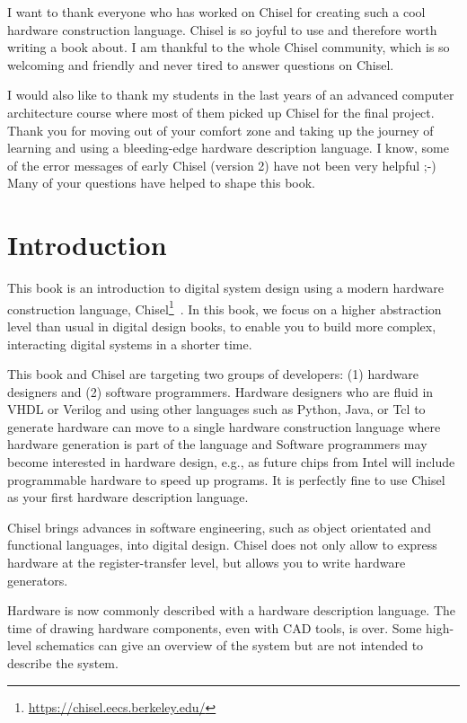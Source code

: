 \documentclass[%
    10pt,
    headinclude, footexclude,
    openright, %
    notitlepage,
    cleardoubleempty,
    headsepline,
    pointlessnumbers,
    bibtotoc, idxtotoc,
    ]{scrbook}
\newcommand{\myref}[2]{\href{#1}{#2}}
\renewcommand{\myref}[2]{{#2}{\footnote{\url{#1}}}}
\begin{document}
I want to thank everyone who has worked on Chisel for creating such
a cool hardware construction language. Chisel is so joyful to use and
therefore worth writing a book about.
I am thankful to the whole Chisel community, which is so welcoming and friendly
and never tired to answer questions on Chisel.

I would also like to thank my students in the last years of an advanced computer
architecture course where most of them picked up Chisel for the final project.
Thank you for moving out of your comfort zone and taking up the journey of
learning and using a bleeding-edge hardware description language. I know, some of
the error messages of early Chisel (version 2) have not been very helpful ;-)
Many of your questions have helped to shape this book.


\mainmatter

\chapter{Introduction}
\label{sec:intro}

This book is an introduction to digital system design using a modern hardware
construction language, \myref{https://chisel.eecs.berkeley.edu/}{Chisel}~\cite{chisel:dac2012}.
In this book, we focus on a higher abstraction level than usual in digital design books,
to enable you to build more complex, interacting digital systems in a shorter time.

This book and Chisel are targeting two groups of developers:
(1) hardware designers and (2) software programmers.
Hardware designers who are fluid in VHDL or Verilog and using other languages such as Python,
Java, or Tcl to generate hardware can move to a single hardware construction language
where hardware generation is part of the language and
Software programmers may become interested in hardware design,
e.g., as future chips from Intel will include programmable hardware to speed up programs.
It is perfectly fine to use Chisel as your first hardware description language.

Chisel brings advances in software engineering, such as object orientated
and functional languages, into digital design.
Chisel does not only allow to express hardware at the register-transfer level,
but allows you to write hardware generators.

Hardware is now commonly described with a hardware description language.
The time of drawing hardware components, even with CAD tools, is
over. Some high-level schematics can give an overview of the system but are
not intended to describe the system.
\end{document}
